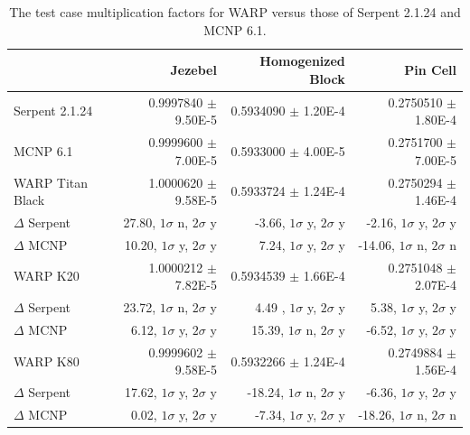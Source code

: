 \documentclass[preprint,12pt]{elsarticle}
\begin{document}
\begin{table}[h]
\centering
\caption{The test case multiplication factors for WARP versus those of Serpent 2.1.24 and MCNP 6.1.}
\label{results_table_keff}
\scriptsize
\begin{tabular}{| l | r | r | r |}
\cline{2-4}
\multicolumn{1}{c|}{}               & Jezebel                         &  Homogenized Block               & Pin Cell                          \\
\hline                          
Serpent 2.1.24                      & 0.9997840 $\pm$ 9.50E-5         & 0.5934090 $\pm$ 1.20E-4          & 0.2750510 $\pm$ 1.80E-4           \\
\hline                          
MCNP 6.1                            & 0.9999600 $\pm$ 7.00E-5         & 0.5933000 $\pm$ 4.00E-5          & 0.2751700 $\pm$ 7.00E-5           \\
\hline                          
WARP Titan Black                    & 1.0000620 $\pm$ 9.58E-5         & 0.5933724 $\pm$ 1.24E-4          & 0.2750294 $\pm$ 1.46E-4           \\
    \qquad\qquad   $\Delta$ Serpent & 27.80, $1\sigma$ n, $2\sigma$ y & -3.66, $1\sigma$ y, $2\sigma$ y  &  -2.16, $1\sigma$ y, $2\sigma$ y  \\
    \qquad\qquad   $\Delta$ MCNP    & 10.20, $1\sigma$ y, $2\sigma$ y &  7.24, $1\sigma$ y, $2\sigma$ y  & -14.06, $1\sigma$ n, $2\sigma$ n  \\
\hline
WARP K20                            & 1.0000212 $\pm$ 7.82E-5         & 0.5934539 $\pm$ 1.66E-4          & 0.2751048 $\pm$ 2.07E-4           \\
    \qquad\qquad   $\Delta$ Serpent & 23.72, $1\sigma$ n, $2\sigma$ y & 4.49 , $1\sigma$ y, $2\sigma$ y  &   5.38, $1\sigma$ y, $2\sigma$ y  \\
    \qquad\qquad   $\Delta$ MCNP    &  6.12, $1\sigma$ y, $2\sigma$ y & 15.39, $1\sigma$ n, $2\sigma$ y  &  -6.52, $1\sigma$ y, $2\sigma$ y  \\
\hline
WARP K80                            & 0.9999602 $\pm$ 9.58E-5         & 0.5932266 $\pm$ 1.24E-4          & 0.2749884 $\pm$ 1.56E-4           \\
    \qquad\qquad   $\Delta$ Serpent & 17.62, $1\sigma$ y, $2\sigma$ y & -18.24, $1\sigma$ n, $2\sigma$ y &  -6.36, $1\sigma$ y, $2\sigma$ y  \\
    \qquad\qquad   $\Delta$ MCNP    &  0.02, $1\sigma$ y, $2\sigma$ y &  -7.34, $1\sigma$ y, $2\sigma$ y & -18.26, $1\sigma$ n, $2\sigma$ n  \\
\hline
\end{tabular}


\end{table}
\end{document}
